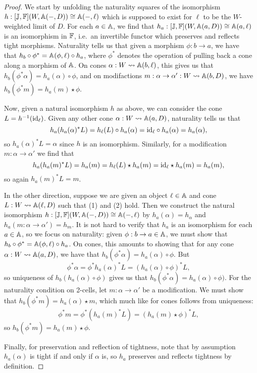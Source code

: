 \documentclass[../thesis.tex]{subfiles}
\begin{document}
\begin{proof}
  We start by unfolding the naturality squares of the isomorphism $h : [{\mathbb{J}},{\mathbb{F}}](W,{\mathbb{A}}(-,D)) \cong {\mathbb{A}}(-,\ell)$
  which is supposed to exist for $\ell$ to be the $W$-weighted limit of $D$. For each $a \in {\mathbb{A}}$, we find that
  $h_a : [{\mathbb{J}},{\mathbb{F}}](W,{\mathbb{A}}(a,D)) \cong {\mathbb{A}}(a,\ell)$ is an isomorphism in ${\mathbb{F}}$, i.e.\ an invertible functor which
  preserves and reflects tight morphisms. Naturality tells us that given a morphism $\phi : b \to a$, we have
  that $h_b \circ \phi^* = {\mathbb{A}}(\phi,\ell) \circ h_a$, where $\phi^*$ denotes the operation of pulling back a 
  cone along a morphism of ${\mathbb{A}}$. On cones $\alpha : W \rightsquigarrow {\mathbb{A}}(b,\ell)$, this gives us that $h_b(\phi^*
  \alpha) = h_a(\alpha) \circ \phi$, and on modifactions $m : \alpha \to \alpha' : W \rightsquigarrow {\mathbb{A}}(b,D)$, we
  have $h_b(\phi^*m) = h_a(m) \star \phi$.

  Now, given a natural isomorphism $h$ as above, we can consider the cone $L = h^{-1}({\mathrm{id}}_\ell)$. Given any
  other cone $\alpha : W \rightsquigarrow {\mathbb{A}}(a,D)$, naturality tells us that
  \[h_a(h_a(\alpha)^*L) = h_\ell(L) \circ h_a(\alpha) = {\mathrm{id}}_\ell \circ h_a(\alpha) = h_a(\alpha),\]
  so $h_a(\alpha)^*L = \alpha$ since $h$ is an isomorphism. Similarly, for a modification $m : \alpha \to
  \alpha'$ we find that
  \[h_a(h_a(m)^*L) = h_a(m) = h_\ell(L) \star h_a(m) = {\mathrm{id}}_\ell \star h_a(m) = h_a(m),\]
  so again $h_a(m)^*L = m$.


  In the other direction, suppose we are given an object $\ell \in {\mathbb{A}}$ and cone $L : W \rightsquigarrow {\mathbb{A}}(\ell,D)$
  such that (1) and (2) hold. Then we construct the natural isomorphism $h : [{\mathbb{J}},{\mathbb{F}}](W,{\mathbb{A}}(-,D)) \cong
  {\mathbb{A}}(-,\ell)$ by $h_a(\alpha) = h_\alpha$ and $h_a(m : \alpha \to \alpha') = h_m$. It is not hard to verify
  that $h_a$ is an isomorphism for each $a \in {\mathbb{A}}$, so we focus on naturality: given $\phi : b \to a \in
  {\mathbb{A}}$, we must show that $h_b \circ \phi^* = {\mathbb{A}}(\phi,\ell) \circ h_a$. On cones, this amounts to showing
  that for any cone $\alpha : W \rightsquigarrow {\mathbb{A}}(a,D)$, we have that $h_b(\phi^*\alpha) = h_a(\alpha) \circ \phi$.
  But
  \[
    \phi^*\alpha = \phi^*h_a(\alpha)^*L = (h_a(\alpha) \circ \phi)^*L,
  \]
  so uniqueness of $h_b(h_a(\alpha) \circ \phi)$ gives us that $h_b(\phi^*\alpha) = h_a(\alpha) \circ \phi)$.
  For the naturality condition on 2-cells, let $m : \alpha \to \alpha'$ be a modification. We must show that
  $h_b(\phi^*m) = h_a(\alpha) \star m$, which much like for cones follows from uniqueness:
  \[\phi^*m = \phi^*(h_a(m)^*L) = (h_a(m)\star\phi)^*L,\]
  so $h_b(\phi^*m) = h_a(m)\star\phi$.

  Finally, for preservation and reflection of tightness, note that by assumption $h_a(\alpha)$ is tight if and
  only if $\alpha$ is, so $h_a$ preserves and reflects tightness by definition.
\end{proof}
\end{document}

